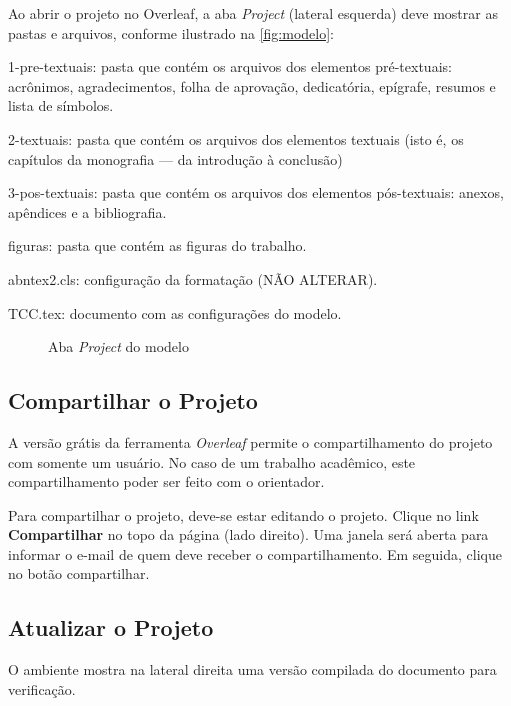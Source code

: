 Ao abrir o projeto no Overleaf, a aba \textit{Project} (lateral esquerda) deve mostrar as pastas e arquivos, conforme ilustrado na \autoref{fig:modelo}:
\begin{alineas}
	\item 1-pre-textuais: pasta que contém os arquivos dos elementos pré-textuais: acrônimos, agradecimentos, folha de aprovação, dedicatória, epígrafe, resumos e lista de símbolos.
	\item 2-textuais: pasta que contém os arquivos dos elementos textuais (isto é, os capítulos da monografia --- da introdução à conclusão)
	\item 3-pos-textuais: pasta que contém os arquivos dos elementos pós-textuais: anexos, apêndices e a bibliografia.
	\item figuras: pasta que contém as figuras do trabalho.
	\item abntex2.cls: configuração da formatação (NÃO ALTERAR).
	\item TCC.tex: documento com as configurações do modelo. 
\end{alineas}

\begin{figure}[!ht]
	\caption{Aba \textit{Project} do modelo}
	\centering 
	\label{fig:modelo}
\end{figure}    

\subsection{Compartilhar o Projeto}
\label{sec:compartilhar} 

A versão grátis da ferramenta \textit{Overleaf} permite o compartilhamento do projeto com somente um usuário. No caso de um trabalho acadêmico, este compartilhamento poder ser feito com o orientador. 

Para compartilhar o projeto, deve-se estar editando o projeto. Clique no link \textbf{Compartilhar} no topo da página (lado direito). Uma janela será aberta para informar o e-mail de quem deve receber o compartilhamento. Em seguida, clique no botão compartilhar. 

\subsection{Atualizar o Projeto}
\label{sec:atualizar} 

O ambiente mostra na lateral direita uma versão compilada do documento para verificação. 

